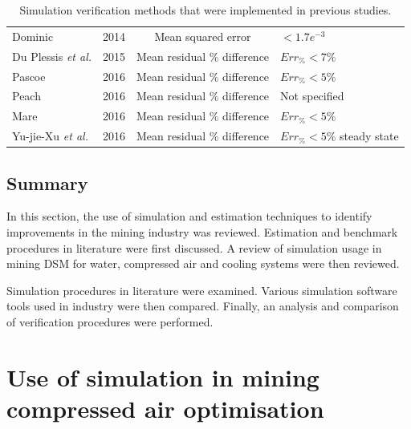 \begin{table}[h]
\begin{tabular}{p{5cm}ccl}
 			Dominic \cite{dominic2014dynamic}					& 2014 & Mean squared error & $<1.7e^{-3}$	\\
 			Du Plessis \textit{et al.}\cite{du2015development} 	& 2015 & Mean residual \% difference & $Err_{\%} <7\%$ \\
 			Pascoe \cite{Pascoe2016Masters} 					& 2016 & Mean residual \% difference & $Err_{\%} <5\%$ \\	
			Peach \cite{Peach2016Masters}						& 2016 & Mean residual \% difference & Not specified\\
 			Mare \cite{Mare2016PhD} 							& 2016 & Mean residual \% difference & $Err_{\%} <5\%$  \\	
 			Yu-jie-Xu \textit{et al.} \cite{xu2016modeling}		& 2016 & Mean residual \% difference & $Err_{\%} <5\%$ steady state \\
 			\hline
 		\end{tabular} 
 		\caption{Simulation verification methods that were implemented in previous studies.}
 		\label{table: Verification studies}
 	\end{table}
 	\subsection{Summary}
 	In this section, the use of simulation and estimation techniques to identify improvements in the mining industry was reviewed. Estimation and benchmark procedures in literature were first discussed. A review of simulation usage in mining DSM for water, compressed air and cooling systems were then reviewed.
 	
 	Simulation procedures in literature were examined. Various simulation software tools used in industry were then compared. Finally, an analysis and comparison of verification procedures were performed.
 	
\section{Use of simulation in mining compressed air optimisation}
\label{CompressorSimulation Literature}
